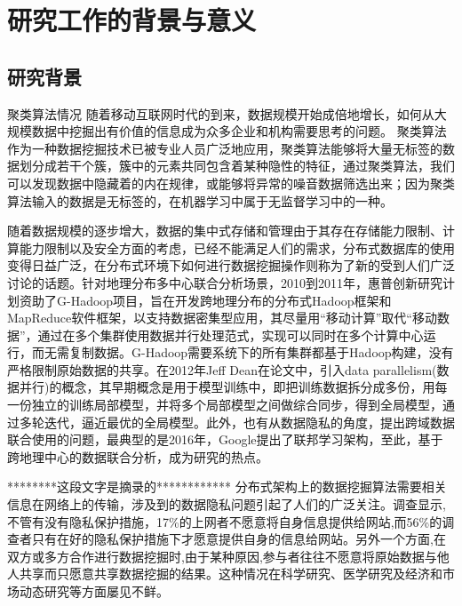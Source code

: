 \thesischapterexordium

\section{研究工作的背景与意义}

\subsection{研究背景}

聚类算法情况
随着移动互联网时代的到来，数据规模开始成倍地增长，如何从大规模数据中挖掘出有价值的信息成为众多企业和机构需要思考的问题。
聚类算法作为一种数据挖掘技术已被专业人员广泛地应用，聚类算法能够将大量无标签的数据划分成若干个簇，簇中的元素共同包含着某种隐性的特征，通过聚类算法，我们可以发现数据中隐藏着的内在规律，或能够将异常的噪音数据筛选出来；因为聚类算法输入的数据是无标签的，在机器学习中属于无监督学习中的一种。

随着数据规模的逐步增大，数据的集中式存储和管理由于其存在存储能力限制、计算能力限制以及安全方面的考虑，已经不能满足人们的需求，分布式数据库的使用变得日益广泛，在分布式环境下如何进行数据挖掘操作则称为了新的受到人们广泛讨论的话题。针对地理分布多中心联合分析场景，2010到2011年，惠普创新研究计划资助了G-Hadoop项目，旨在开发跨地理分布的分布式Hadoop框架和MapReduce软件框架，以支持数据密集型应用，其尽量用“移动计算”取代“移动数据”，通过在多个集群使用数据并行处理范式，实现可以同时在多个计算中心运行，而无需复制数据。G-Hadoop需要系统下的所有集群都基于Hadoop构建，没有严格限制原始数据的共享。在2012年Jeff Dean在论文\cite{dean2012large}中，引入data parallelism(数据并行)的概念，其早期概念是用于模型训练中，即把训练数据拆分成多份，用每一份独立的训练局部模型，并将多个局部模型之间做综合同步，得到全局模型，通过多轮迭代，逼近最优的全局模型。此外，也有从数据隐私的角度，提出跨域数据联合使用的问题，最典型的是2016年，Google提出了联邦学习架构，至此，基于跨地理中心的数据联合分析，成为研究的热点。

********这段文字是摘录的************
分布式架构上的数据挖掘算法需要相关信息在网络上的传输，涉及到的数据隐私问题引起了人们的广泛关注。调查显示,不管有没有隐私保护措施，17\%的上网者不愿意将自身信息提供给网站,而56\%的调查者只有在好的隐私保护措施下才愿意提供自身的信息给网站。另外一个方面,在双方或多方合作进行数据挖掘时,由于某种原因,参与者往往不愿意将原始数据与他人共享而只愿意共享数据挖掘的结果。这种情况在科学研究、医学研究及经济和市场动态研究等方面屡见不鲜。


